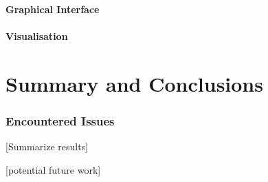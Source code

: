 \documentclass[a4paper,12pt,twoside,openright]{report}
\begin{document}
\subsubsection{Graphical Interface}

\subsubsection{Visualisation}


\chapter{Summary and Conclusions} 

\subsection{Encountered Issues}

[Summarize results]

[potential future work]

\appendix
\singlespacing

 
 
\end{document}
